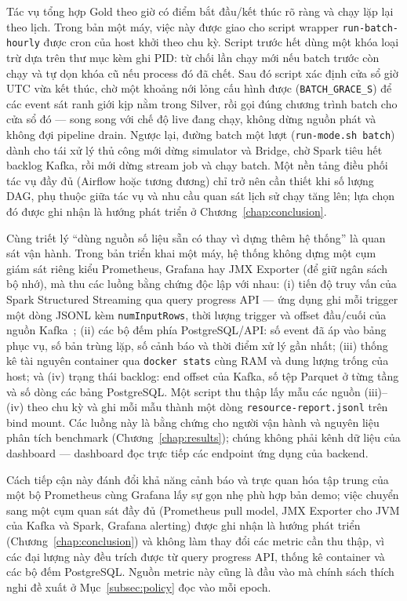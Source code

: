 Tác vụ tổng hợp Gold theo giờ có điểm bắt đầu/kết thúc rõ ràng và chạy lặp
lại theo lịch. Trong bản một máy, việc này được giao cho script wrapper
\texttt{run-batch-hourly} được cron của host khởi theo chu kỳ. Script trước
hết dùng một khóa loại trừ dựa trên thư mục kèm ghi PID: từ chối lần chạy
mới nếu batch trước còn chạy và tự dọn khóa cũ nếu process đó đã chết. Sau
đó script xác định cửa sổ giờ UTC vừa kết thúc, chờ một khoảng nới lỏng cấu
hình được (\texttt{BATCH\_GRACE\_S}) để các event sát ranh giới kịp nằm
trong Silver, rồi gọi đúng chương trình batch cho cửa sổ đó --- song song
với chế độ live đang chạy, không dừng nguồn phát và không đợi pipeline
drain. Ngược lại, đường batch một lượt (\texttt{run-mode.sh batch}) dành
cho tái xử lý thủ công mới dừng simulator và Bridge, chờ Spark tiêu hết
backlog Kafka, rồi mới dừng stream job và chạy batch. Một nền tảng điều phối
tác vụ đầy đủ (Airflow hoặc tương đương) chỉ trở nên cần thiết khi số lượng
DAG, phụ thuộc giữa tác vụ và nhu cầu quan sát lịch sử chạy tăng lên; lựa
chọn đó được ghi nhận là hướng phát triển ở Chương~\ref{chap:conclusion}.

Cùng triết lý ``dùng nguồn số liệu sẵn có thay vì dựng thêm hệ thống'' là
quan sát vận hành. Trong bản triển khai một máy, hệ thống không dựng một cụm
giám sát riêng kiểu Prometheus, Grafana hay JMX Exporter (để giữ ngân sách
bộ nhớ), mà thu các luồng bằng chứng độc lập với nhau: (i) tiến độ truy vấn
của Spark Structured Streaming qua query progress API --- ứng dụng ghi mỗi
trigger một dòng JSONL kèm \texttt{numInputRows}, thời lượng trigger và
offset đầu/cuối của nguồn Kafka~\cite{spark_docs_4_2}; (ii) các bộ đếm phía
PostgreSQL/API: số event đã áp vào bảng phục vụ, số bản trùng lặp, số cảnh
báo và thời điểm xử lý gần nhất; (iii) thống kê tài nguyên container qua
\texttt{docker stats} cùng RAM và dung lượng trống của host; và (iv) trạng
thái backlog: end offset của Kafka, số tệp Parquet ở từng tầng và số dòng
các bảng PostgreSQL. Một script thu thập lấy mẫu các nguồn (iii)--(iv) theo
chu kỳ và ghi mỗi mẫu thành một dòng \texttt{resource-report.jsonl} trên
bind mount. Các luồng này là bằng chứng cho người vận hành và nguyên liệu
phân tích benchmark (Chương~\ref{chap:results}); chúng không phải kênh dữ
liệu của dashboard --- dashboard đọc trực tiếp các endpoint ứng dụng của
backend.

Cách tiếp cận này đánh đổi khả năng cảnh báo và trực quan hóa tập trung của
một bộ Prometheus cùng Grafana lấy sự gọn nhẹ phù hợp bản demo; việc chuyển
sang một cụm
quan sát đầy đủ (Prometheus pull model, JMX Exporter cho JVM của Kafka và
Spark,
Grafana alerting) được ghi nhận là hướng phát triển
(Chương~\ref{chap:conclusion}) và không làm thay đổi các metric cần thu thập,
vì các đại lượng này đều trích được từ query progress API, thống kê
container và các bộ đếm PostgreSQL. Nguồn
metric này cũng là đầu vào mà chính sách thích nghi đề xuất ở
Mục~\ref{subsec:policy} đọc vào mỗi epoch.

